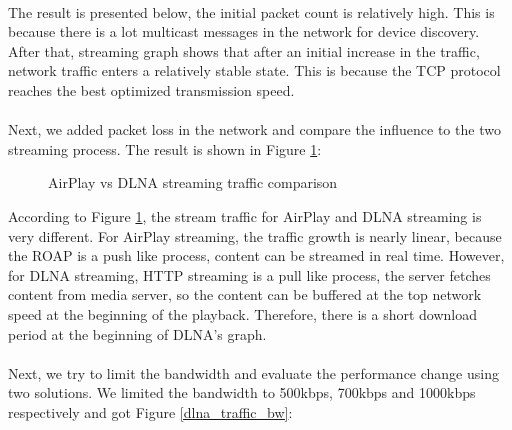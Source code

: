 \\
The result is presented below, the initial packet count is relatively high. This is because there is a lot multicast messages in the network for device discovery. After that, streaming graph shows that after an initial increase in the traffic, network traffic enters a relatively stable state. This is because the TCP protocol reaches the best optimized transmission speed.\\
\\
Next, we added packet loss in the network and compare the influence to the two
streaming process. The result is shown in Figure \ref{airplay_vs_dlna_traffic}:\\
\begin{figure}
\hfill
{}
\hfill
{}
\hfill
\caption{AirPlay vs DLNA streaming traffic
comparison \label{airplay_vs_dlna_traffic}}
\end{figure}

According to Figure \ref{airplay_vs_dlna_traffic}, the stream traffic for
AirPlay and DLNA streaming is very different. For AirPlay streaming, the traffic
growth is nearly linear, because the ROAP is a push like process, content can be
streamed in real time. However, for DLNA streaming, HTTP streaming is a pull
like process, the server fetches content from media server, so the content can
be buffered at the top network speed at the beginning of the playback.
Therefore, there is a short download period at the beginning of DLNA's
graph. \\ 
\\
Next, we try to limit the bandwidth and evaluate the performance change using
two solutions. We limited the bandwidth to 500kbps, 700kbps and 1000kbps
respectively and got Figure \ref{dlna_traffic_bw}:\\

